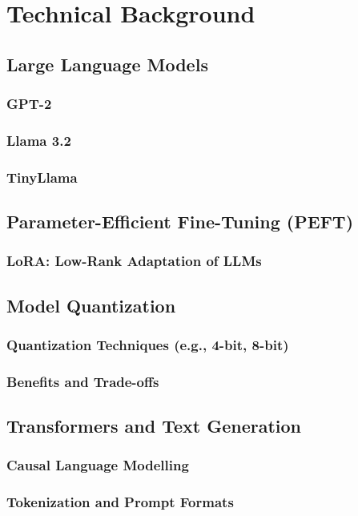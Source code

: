 \clearpage

\chapter{Technical Background}

\section{Large Language Models}
\subsection{GPT-2}
\subsection{Llama 3.2}
\subsection{TinyLlama}

\section{Parameter-Efficient Fine-Tuning (PEFT)}
\subsection{LoRA: Low-Rank Adaptation of LLMs}

\section{Model Quantization}
\subsection{Quantization Techniques (e.g., 4-bit, 8-bit)}
\subsection{Benefits and Trade-offs}

\section{Transformers and Text Generation}
\subsection{Causal Language Modelling}
\subsection{Tokenization and Prompt Formats}

\newpage
